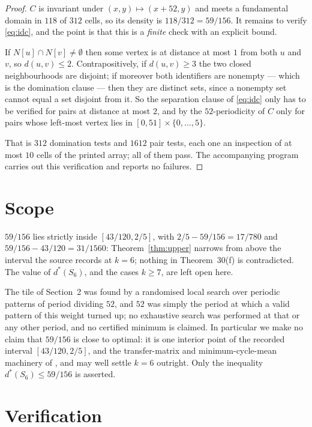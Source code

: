 \documentclass[11pt]{amsart}
\theoremstyle{remark}
\newcommand{\Ncl}{N}
\newcommand{\dstar}{d^{*}}
\begin{document}
\begin{proof}
$C$ is invariant under $(x,y)\mapsto(x+52,y)$ and meets a fundamental domain in $118$ of
$312$ cells, so its density is $118/312=59/156$. It remains to verify \eqref{eq:idc}, and
the point is that this is a \emph{finite} check with an explicit bound.

If $\Ncl[u]\cap \Ncl[v]\neq\emptyset$ then some vertex is at distance at most $1$ from
both $u$ and $v$, so $d(u,v)\le2$. Contrapositively, if $d(u,v)\ge3$ the two closed
neighbourhoods are disjoint; if moreover both identifiers are nonempty --- which is the
domination clause --- then they are distinct sets, since a nonempty set cannot equal a set
disjoint from it. So the separation clause of \eqref{eq:idc} only has to be verified for
pairs at distance at most $2$, and by the $52$-periodicity of $C$ only for pairs whose
left-most vertex lies in $[0,51]\times\{0,\dots,5\}$.

That is $312$ domination tests and $1612$ pair tests, each one an inspection of at most
$10$ cells of the printed array; all of them pass. The accompanying program carries out this
verification and reports no failures.
\end{proof}

\section{Scope}

$59/156$ lies strictly inside $[43/120,2/5]$, with $2/5-59/156=17/780$ and
$59/156-43/120=31/1560$: Theorem~\ref{thm:upper} narrows from above the interval the source
records at $k=6$; nothing in Theorem~30(f) is contradicted. The value of $\dstar(S_6)$, and
the cases $k\ge7$, are left open here.

The tile of Section~2 was found by a randomised local search over periodic patterns of period
dividing $52$, and $52$ was simply the period at which a valid pattern of this weight turned up;
no exhaustive search was performed at that or any other period, and no certified minimum is
claimed. In particular we make no claim that $59/156$ is close to optimal: it is one interior
point of the recorded interval $[43/120,2/5]$, and the transfer-matrix and minimum-cycle-mean
machinery of \cite{Jiang}, \cite{BHP} and \cite{BDMP} may well settle $k=6$ outright. Only the
inequality $\dstar(S_6)\le59/156$ is asserted.

\section{Verification}
\end{document}
